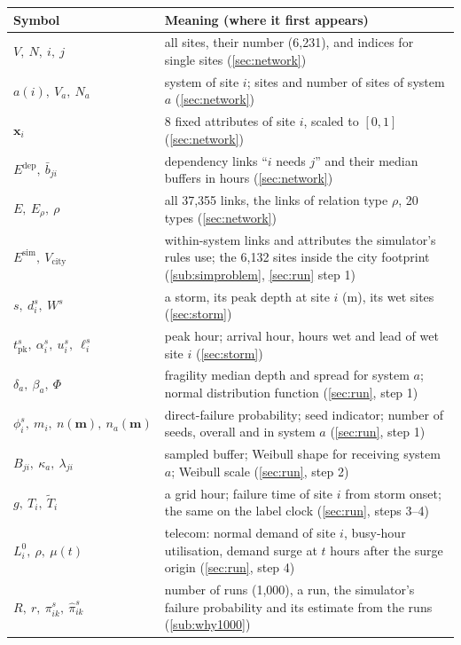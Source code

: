 \documentclass[11pt]{article}
\newcommand{\pk}{\mathrm{pk}}
\newcommand{\dep}{\mathrm{dep}}
\begin{document}
\renewcommand{\arraystretch}{1.08}\small
\begin{tabular}{@{}p{}p{}@{}}
\toprule
\textbf{Symbol} & \textbf{Meaning (where it first appears)} \\
\midrule
$V,\ N,\ i,\ j$ & all sites, their number (6,231), and indices for single sites (\ref{sec:network}) \\
$a(i),\ V_a,\ N_a$ & system of site $i$; sites and number of sites of system $a$ (\ref{sec:network}) \\
$\mathbf x_i$ & 8 fixed attributes of site $i$, scaled to $[0,1]$ (\ref{sec:network}) \\
$E^{\dep},\ \bar b_{ji}$ & dependency links ``$i$ needs $j$'' and their median buffers in hours (\ref{sec:network}) \\
$E,\ E_\rho,\ \rho$ & all 37,355 links, the links of relation type $\rho$, 20 types (\ref{sec:network}) \\
$E^{\mathrm{sim}},\ V_{\mathrm{city}}$ & within-system links and attributes the simulator's rules use; the 6,132 sites inside the city footprint (\ref{sub:simproblem}, \ref{sec:run} step 1) \\
$s,\ d_i^s,\ W^s$ & a storm, its peak depth at site $i$ (m), its wet sites (\ref{sec:storm}) \\
$t^s_{\pk},\ \alpha_i^s,\ u_i^s,\ \ell_i^s$ & peak hour; arrival hour, hours wet and lead of wet site $i$ (\ref{sec:storm}) \\
$\delta_a,\ \beta_a,\ \Phi$ & fragility median depth and spread for system $a$; normal distribution function (\ref{sec:run}, step 1) \\
$\phi_i^s,\ m_i,\ n(\mathbf m),\ n_a(\mathbf m)$ & direct-failure probability; seed indicator; number of seeds, overall and in system $a$ (\ref{sec:run}, step 1) \\
$B_{ji},\ \kappa_a,\ \lambda_{ji}$ & sampled buffer; Weibull shape for receiving system $a$; Weibull scale (\ref{sec:run}, step 2) \\
$g,\ T_i,\ \tilde T_i$ & a grid hour; failure time of site $i$ from storm onset; the same on the label clock (\ref{sec:run}, steps 3--4) \\
$L^0_i,\ \rho,\ \mu(t)$ & telecom: normal demand of site $i$, busy-hour utilisation, demand surge at $t$ hours after the surge origin (\ref{sec:run}, step 4) \\
$R,\ r,\ \pi^s_{ik},\ \widehat{\pi}^s_{ik}$ & number of runs (1,000), a run, the simulator's failure probability and its estimate from the runs (\ref{sub:why1000}) \\

\end{tabular}
\end{document}

